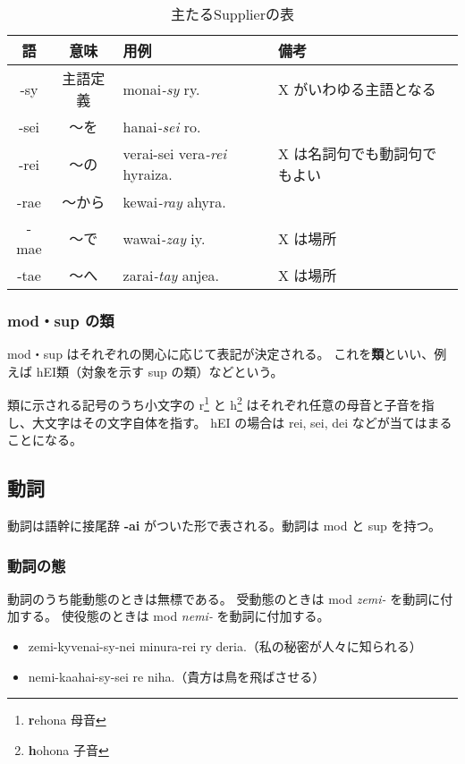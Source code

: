 \begin{table}[h]
    \centering
    \caption{主たるSupplierの表}
    \begin{tabular}{ccll}
        \hline
        語 & 意味 & 用例 & 備考 \\
        \hline \hline
        -sy   & 主語定義 & monai\emph{-sy} ry. & X がいわゆる主語となる \\
        -sei  & ～を & hanai\emph{-sei} ro.           & \\
        -rei  & ～の & verai-sei vera\emph{-rei} hyraiza.   & X は名詞句でも動詞句でもよい \\
        -rae & ～から & kewai\emph{-ray} ahyra.            & \\
        -mae & ～で & wawai\emph{-zay} iy.           & X は場所 \\
        -tae & ～へ & zarai\emph{-tay} anjea.              & X は場所 \\
        \hline
    \end{tabular}
\end{table}

\subsubsection{mod・sup の類}
mod・sup はそれぞれの関心に応じて表記が決定される。
これを\textbf{類}といい、例えば hEI類（対象を示す sup の類）などという。

類に示される記号のうち小文字の r\footnote{\textbf{r}ehona 母音} と h\footnote{\textbf{h}ohona 子音} はそれぞれ任意の母音と子音を指し、大文字はその文字自体を指す。
hEI の場合は rei, sei, dei などが当てはまることになる。

\subsection{動詞}

動詞は語幹に接尾辞 \textbf{-ai} がついた形で表される。動詞は mod と sup を持つ。

\subsubsection{動詞の態}

動詞のうち能動態のときは無標である。
受動態のときは mod \emph{zemi-} を動詞に付加する。
使役態のときは mod \emph{nemi-} を動詞に付加する。

\begin{itemize}
    \item zemi-kyvenai-sy-nei minura-rei ry deria.（私の秘密が人々に知られる）
    \item nemi-kaahai-sy-sei re niha.（貴方は鳥を飛ばさせる）
\end{itemize}


